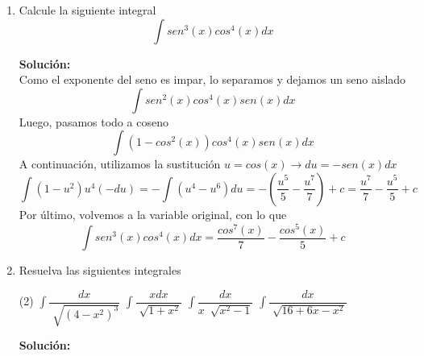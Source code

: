 \documentclass[12pt]{article}
\newenvironment{solucion}
{\begin{mdframed}[backgroundcolor=black!10]
		{\bf Solución:}\\
	}
	{
	\end{mdframed}
}
\newenvironment{preguntas}
{\begin{enumerate}\itemsep12pt
	}
	{
	\end{enumerate}
}
\newcommand{\ra}{\rightarrow}
\begin{document}
\begin{preguntas}
\begin{solucion}
\begin{enumerate}[a)]
\item $\displaystyle\int sec^4(x)tan^2(x)dx$\\\\
			En el caso de las secantes y tangentes, mientras el exponente de la secante y la tangente no sean impar y pan, respectivamente de manera simultanea, siempre podremos acuidar a pasar todo a tangente o todo a secante, de la siguiente forma
			$$\displaystyle\int sec^4(x)tan^2(x)dx
			=\displaystyle\int sec^2(x)tan^2(x)sec^2(x)dx$$
			$$=\displaystyle\int (1+tan^2(x))tan^2(x)sec^2(x)dx$$
			Luego,
			$$u = tan(x) \ra du = sec^2(x)dx$$
			Con lo que tenemos
			$$=\displaystyle\int (1+u^2)u^2du
			= \displaystyle\int (u^2+u^4)du
			= \dfrac{u^3}{3} + \dfrac{u^5}{5} + c$$
			Finalmente, volvemos a la variable original, con lo que
			$$\displaystyle\int sec^4(x)tan^2(x)dx = \dfrac{tan^3(x)}{3} + \dfrac{tan^5(x)}{5} + c$$
\item $\displaystyle\int sec^3(x)tan^3(x)dx$\\\\
			Como dije antes, también podemos convertir todo en secantes. Esto se hace de la siguiente forma
			$$\displaystyle\int sec^3(x)tan^3(x)dx
			= \displaystyle\int sec^2(x)tan^2(x)sec(x)tan(x)dx$$
			$$ = \displaystyle\int sec^2(x)(sec^2(x)-1)sec(x)tan(x)dx$$
			En este caso, hacemos el cambio
			$$u = sec(x) \ra du = sec(x)tan(x)$$
			Con lo que obtenemos
			$$ = \displaystyle\int u^2(u^2-1)du
			= \displaystyle\int (u^4-u^2)du
			= \dfrac{u^5}{5} - \dfrac{u^3}{3} + c$$
			Finalmente, volvemos a la variable original, con lo que
			$$= \dfrac{sec^5(x)}{5} - \dfrac{sec^3(x)}{3} + c$$	
\end{enumerate}
\end{solucion}
\item Calcule la siguiente integral
	$$\displaystyle\int sen^3(x)cos^4(x)dx$$
\begin{solucion}
Como el exponente del seno es impar, lo separamos y dejamos un seno aislado
		$$\displaystyle\int sen^2(x)cos^4(x) sen(x)dx$$
		Luego, pasamos todo a coseno
		$$\displaystyle\int (1-cos^2(x))cos^4(x) sen(x)dx$$
		A continuación, utilizamos la sustitución $u = cos(x) \ra du = -sen(x)dx$
		$$\displaystyle\int (1-u^2)u^4(- du) = -\displaystyle\int (u^4-u^6)du = -(\dfrac{u^5}{5} - \dfrac{u^7}{7}) +c= \dfrac{u^7}{7}-\dfrac{u^5}{5} + c$$
		Por último, volvemos a la variable original, con lo que
		$$\displaystyle\int sen^3(x)cos^4(x)dx = \dfrac{cos^7(x)}{7}-\dfrac{cos^5(x)}{5} + c$$
\end{solucion}
\item Resuelva las siguientes integrales
\begin{tasks}(2)
\task $\displaystyle\int \dfrac{dx}{\sqrt[]{(4-x^2)^3}}$
\task $\displaystyle\int \dfrac{xdx}{\sqrt[]{1+x^2}}$
\task $\displaystyle\int \dfrac{dx}{x\ \sqrt[]{x^2-1}}$
\task $\displaystyle\int \dfrac{dx}{\sqrt[]{16+6x-x^2}}$
\end{tasks}
\begin{solucion}


\end{solucion}
\end{preguntas}
\end{document}

